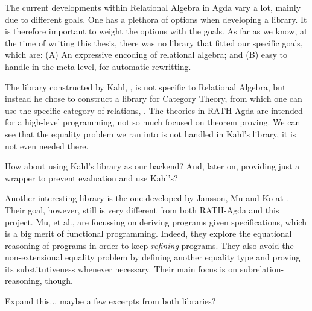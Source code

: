 The current developments within Relational Algebra in Agda vary a lot, mainly due to
different goals. One has a plethora of options when developing a library. It is therefore
important to weight the options with the goals. As far as we know, at the time
of writing this thesis, there was no library that fitted our specific goals, which
are: (A) An expressive encoding of relational algebra; and (B) easy to handle in the meta-level,
for automatic rewritting.

The library constructed by Kahl, \cite{RATHAgda}, is not specific to Relational Algebra, but
instead he chose to construct a library for Category Theory, from which one can use
the specific category of relations, . The theories in RATH-Agda are intended
for a high-level programming, not so much focused on theorem proving. We can see that
the equality problem we ran into is not handled in Kahl's library, it is not even needed there.
\begin{TODO}
  \item How about using Kahl's library as our backend? And, later on, providing just
        a wrapper to prevent evaluation and use Kahl's?
\end{TODO}

Another interesting library is the one developed by Jansson, Mu and Ko at \cite{Jansson09}. 
Their goal, however, still is very different from both RATH-Agda and this project.
Mu, et al., are focussing on deriving programs given specifications, which is a big merit of
functional programming. Indeed, they explore the equational reasoning of programs in order to keep
\emph{refining} programs. They also avoid the non-extensional equality problem by defining
another equality type and proving its substitutiveness whenever necessary. Their main focus
is on subrelation-reasoning, though.

\begin{TODO}
  \item Expand this... maybe a few excerpts from both libraries?
\end{TODO}
